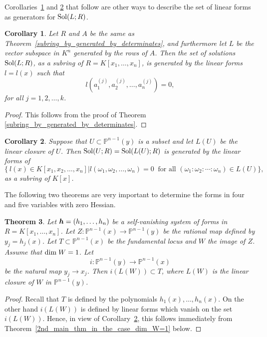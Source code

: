 \documentclass[12pt]{article}
\newtheorem{theorem}{Theorem}[section]
\newtheorem{corollary}[theorem]{Corollary}
\theoremstyle{definition}
\theoremstyle{remark}
\def\dim{{\rm dim}}
\def\sol{{\rm Sol}}
\def\boldh{\mbox{\boldmath $h$}}
\def\om{\omega}
\newcommand {\PP}{\mathbb{P}}
\begin{document}
Corollaries~\ref{ideal_generators_for_L} and \ref{second_description_of_linear_forms} that follow 
are other ways to describe the set of linear forms as generators for $\sol(L;R)$. 

\begin{corollary}   \label{ideal_generators_for_L} %
Let $R$ and $A$ be the same  as Theorem~\ref{subring_by_generated_by_determinates}, and furthermore 
let $L$ be the vector subspace in $K^n$ generated by the rows of $A$. 
Then the set of solutions $\sol(L; R)$, as a subring of $R=K[x_1, \ldots, x_n]$,  is  generated by 
the linear forms $l=l(x)$ such that 
\[l(a^{(j)}_1, a^{(j)}_2, \ldots, a^{(j)}_n)=0, \] 
for all $j=1,2, \dots, k$. 
\end{corollary}
\begin{proof}
This follows from the proof of Theorem \ref{subring_by_generated_by_determinates}.
\end{proof}

\begin{corollary}  \label{second_description_of_linear_forms} %
Suppose that $U \subset \PP ^{n-1}(y)$ is a subset and let $L(U)$ be  the linear closure of $U$. 
Then $\sol(U; R)=\sol(L(U);R)$ is generated by the linear forms of  
\[\{\  l(x) \in K[x_1, x_2, \ldots, x_n] | l(\om _1, \om _2, \ldots, \om _n)=0 \ \mbox{ for all } (\om_1 : \om _2: \cdots : \om _n ) \in L(U) \},\]
as a subring of $K[x]$.    
\end{corollary}

The following two theorems are very important to determine the forms in four and five variables with zero Hessian. 

\begin{theorem}  \label{1st_main_thm_in_the_case_dim_W=1}   %
Let $\boldh = (h_1, \ldots, h_n)$ be a self-vanishing system of forms in $R=K[x_1, \ldots, x_n]$.  
Let $Z:\PP ^{n-1}(x) \rightarrow \PP ^{n-1}(y)$ be the rational map defined by  $y_j =  h_j(x)$. 
Let $T \subset \PP ^{n-1}(x)$ be the fundamental locus and  $W$  the image of $Z$.  
Assume that $\dim \;W=1$. 
Let 
\[i: \PP ^{n-1}(y) \rightarrow \PP ^{n-1}(x)\] be the natural map $y_j \rightarrow x_j$.   
Then $i(L(W)) \subset T$, where  $L(W)$ is the linear closure of $W$ in $\PP ^{n-1}(y)$. 
\end{theorem}
\begin{proof}
Recall that $T$ is defined by the polynomials $h_1(x), \ldots, h_n(x)$. 
On the other hand $i(L(W))$ is defined by linear forms which vanish on the set $i(L(W))$. Hence,  
in view of Corollary~\ref{second_description_of_linear_forms}, this follows immediately 
from Theorem~\ref{2nd_main_thm_in_the_case_dim_W=1} below.    
\end{proof}
\end{document}
